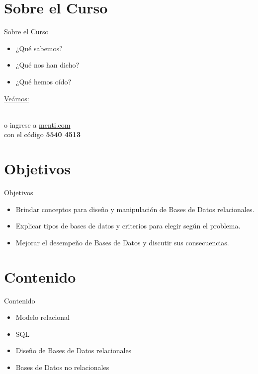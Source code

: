 \documentclass{beamer}
\begin{document}
\section{Sobre el Curso}

\begin{frame}{Sobre el Curso}
\begin{itemize}
    \item ¿Qué sabemos?
    \item ¿Qué nos han dicho?
    \item ¿Qué hemos oído?
\end{itemize}

    \centering
    \vspace{10mm}
    {\small \href{https://www.mentimeter.com/app/presentation/aljzuorbyosmeh7v9vvh4ik9e9y3zdcn/edit?question=fvszuicwkyw2}{Veámos:}}\\
    \vspace{2mm}
  
    \\
    \vspace{2mm}
    \footnotesize  o ingrese a \href{https://www.menti.com/}{menti.com}\\ con el código \textbf{5540 4513}
\end{frame}

\section{Objetivos}

\begin{frame}{Objetivos}
\begin{itemize}
    \item Brindar conceptos para diseño y manipulación de Bases de Datos relacionales.
    \item Explicar tipos de bases de datos y criterios para elegir según el problema.
    \item Mejorar el desempeño de Bases de Datos y discutir sus consecuencias.
\end{itemize}
\end{frame}

\section{Contenido}

\begin{frame}{Contenido}
\begin{itemize}
    \item Modelo relacional
    \item SQL
    \item Diseño de Bases de Datos relacionales
    \item Bases de Datos no relacionales
\end{itemize}
\end{frame}
\end{document}
